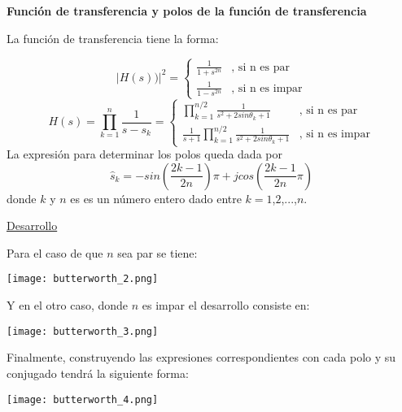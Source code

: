 \documentclass[informe.tex]{subfiles}
\begin{document}
\textbf{Función de transferencia y polos de la función de transferencia}\newline	 	
			  
	La función de transferencia tiene la forma:

        $$
		\left| H(s)) \right|^2 =
		\left \{ 
		    \begin{matrix}
		    \frac{1}{1 + s^{2n}} & \mbox{, si n es par}  \\
       		\frac{1}{1 - s^{2n}} & \mbox{, si n es impar}
		    \end{matrix}
		\right.		
		$$	
		$$
			H(s)=
				\prod_{k=1}^{n}{\frac{1}{s - s_k}}
				=
				\left \{ 
			    \begin{matrix}
			       \prod_{k=1}^{n/2} {\frac{1}{s^2 + 2 sin \theta_k + 1}}
                           & 
                                 \mbox{, si n es par}  \\
		       \frac{1}{s+1} \prod_{k=1}^{n/2} {\frac{1}{s^2 + 2 sin \theta_k + 1} }
                           & 
                                   \mbox{, si n es impar}  
	    \end{matrix}
\right.		
        $$
La expresión para determinar los polos queda dada por 
	$$
		\hat{s}_k = - sin \left( \frac{2k-1}{2n} \right) \pi + j  cos \left( \frac{2k-1}{2n} \pi \right)
	$$        
donde $k$ y $n$ es es un número entero dado entre $k=1$,$2$,...,$n$.
		
\underline{Desarrollo}\newline

   Para el caso de que $n$ sea par se tiene:\newline
	\begin{center}
		\texttt{[image: butterworth\_2.png]}
	\end{center}

 	Y en el otro caso, donde $n$ es impar el desarrollo consiste en:\newline
 	
	\begin{center}
		\centering 
		\texttt{[image: butterworth\_3.png]}
	\end{center}
    		    		
    Finalmente, construyendo las expresiones correspondientes con cada polo y su conjugado tendrá la siguiente forma:\newline		
    \begin{center} \texttt{[image: butterworth\_4.png]}	\end{center}
\end{document}
